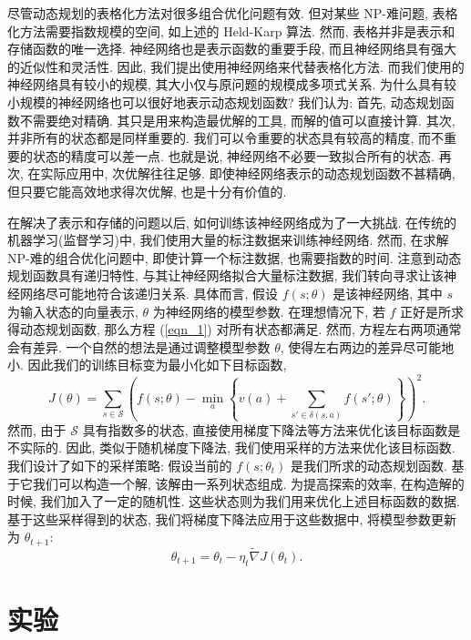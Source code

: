 \documentclass{article}
\begin{document}
尽管动态规划的表格化方法对很多组合优化问题有效. 
但对某些 NP-难问题, 表格化方法需要指数规模的空间, 如上述的 Held-Karp 算法.
然而, 表格并非是表示和存储函数的唯一选择.
神经网络也是表示函数的重要手段, 而且神经网络具有强大的近似性和灵活性.
因此, 我们提出使用神经网络来代替表格化方法.
而我们使用的神经网络具有较小的规模, 其大小仅与原问题的规模成多项式关系.
为什么具有较小规模的神经网络也可以很好地表示动态规划函数? 我们认为: 
首先, 动态规划函数不需要绝对精确. 其只是用来构造最优解的工具, 而解的值可以直接计算.
其次, 并非所有的状态都是同样重要的. 我们可以令重要的状态具有较高的精度, 而不重要的状态的精度可以差一点.
也就是说, 神经网络不必要一致拟合所有的状态.
再次, 在实际应用中, 次优解往往足够.
即使神经网络表示的动态规划函数不甚精确, 但只要它能高效地求得次优解, 也是十分有价值的.

在解决了表示和存储的问题以后, 如何训练该神经网络成为了一大挑战.
在传统的机器学习(监督学习)中, 我们使用大量的标注数据来训练神经网络.
然而, 在求解 NP-难的组合优化问题中, 即使计算一个标注数据, 也需要指数的时间.
注意到动态规划函数具有递归特性, 与其让神经网络拟合大量标注数据, 我们转向寻求让该神经网络尽可能地符合该递归关系.
具体而言, 假设 $f(s; \theta)$ 是该神经网络, 其中 $s$ 为输入状态的向量表示, $\theta$ 为神经网络的模型参数.
在理想情况下, 若 $f$ 正好是所求得动态规划函数, 那么方程 (\ref{eqn_1}) 对所有状态都满足. 
然而, 方程左右两项通常会有差异.
一个自然的想法是通过调整模型参数 $\theta$, 使得左右两边的差异尽可能地小.
因此我们的训练目标变为最小化如下目标函数,
\begin{equation}
J(\theta) = \sum_{s \in \mathcal{S}}\left(f(s;\theta) - \min_a\left\{v(a) + \sum_{s' \in \delta(s, a)}f(s'; \theta)\right\}\right)^2.
\end{equation}
然而, 由于 $\mathcal{S}$ 具有指数多的状态, 直接使用梯度下降法等方法来优化该目标函数是不实际的.
因此, 类似于随机梯度下降法, 我们使用采样的方法来优化该目标函数. 我们设计了如下的采样策略: 
假设当前的 $f(s; \theta_t)$ 是我们所求的动态规划函数. 
基于它我们可以构造一个解, 该解由一系列状态组成. 
为提高探索的效率, 在构造解的时候, 我们加入了一定的随机性. 这些状态则为我们用来优化上述目标函数的数据.
基于这些采样得到的状态, 我们将梯度下降法应用于这些数据中, 将模型参数更新为 $\theta_{t+1}$:
\begin{equation}
\theta_{t+1} = \theta_t - \eta_t\widetilde{\nabla}J(\theta_t).
\end{equation}

\section{实验}
\end{document}
